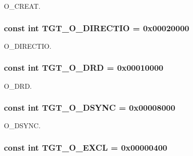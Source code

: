 O\_\-CREAT. \hypertarget{classMipsLinux_a0a80dc00bd46d433f1ff0d38da2f5ded}{
\subsubsection[{TGT\_\-O\_\-DIRECTIO}]{\setlength{\rightskip}{0pt plus 5cm}const int {\bf TGT\_\-O\_\-DIRECTIO} = 0x00020000}}
\label{classMipsLinux_a0a80dc00bd46d433f1ff0d38da2f5ded}


O\_\-DIRECTIO. \hypertarget{classMipsLinux_a83feaef06c27596d44d489ec51e197fd}{
\subsubsection[{TGT\_\-O\_\-DRD}]{\setlength{\rightskip}{0pt plus 5cm}const int {\bf TGT\_\-O\_\-DRD} = 0x00010000}}
\label{classMipsLinux_a83feaef06c27596d44d489ec51e197fd}


O\_\-DRD. \hypertarget{classMipsLinux_ac8d84ac6abb2d868443e4559bed55ebe}{
\subsubsection[{TGT\_\-O\_\-DSYNC}]{\setlength{\rightskip}{0pt plus 5cm}const int {\bf TGT\_\-O\_\-DSYNC} = 0x00008000}}
\label{classMipsLinux_ac8d84ac6abb2d868443e4559bed55ebe}


O\_\-DSYNC. \hypertarget{classMipsLinux_a10d5d118d15b51ebdd4b16dc78342d1d}{
\subsubsection[{TGT\_\-O\_\-EXCL}]{\setlength{\rightskip}{0pt plus 5cm}const int {\bf TGT\_\-O\_\-EXCL} = 0x00000400}}
\label{classMipsLinux_a10d5d118d15b51ebdd4b16dc78342d1d}


